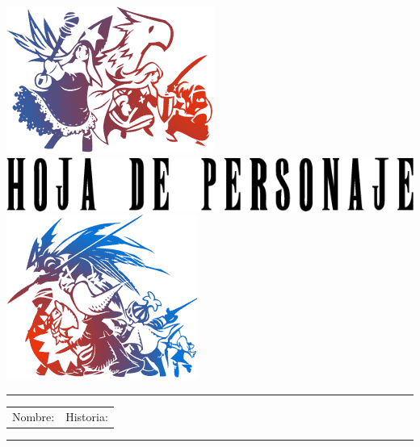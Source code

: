 \thispagestyle{empty}
\Large
\onecolumn
{
	\noindent \includegraphics[width=0.18\columnwidth]{./art/images/tleft.png} 
	\hspace{0.8cm}
	\includegraphics[width=0.55\columnwidth]{./art/images/cs.png}
	\hfill
	\includegraphics[width=0.15\columnwidth]{./art/images/tright.png} \\
}
\vspace{-0.5cm}
\hrule
\begin{tabularx}{\columnwidth}{XX@{\hspace{0.3cm}}}
		\noindent \newline
 \hypertarget{cs}{Nombre:}
		\newline 
		\newline
		\newline
		\newline
		\newline
		\newline
		\newline \newline \newline
		\newline  
		&  
		\noindent \newline
 Historia:
		\newline  \newline 
		\newline \newline \newline \newline \newline
		 \newline
	\end{tabularx}
\hrule 

